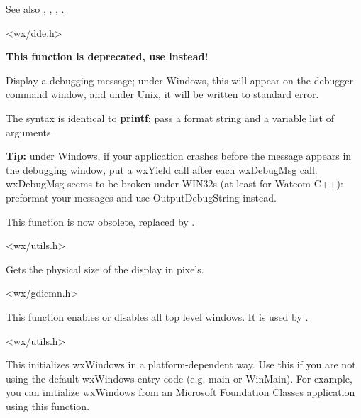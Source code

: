 See also , , ,
.


<wx/dde.h>

\label{wxdebugmsg}


{\bf This function is deprecated, use  instead!}

Display a debugging message; under Windows, this will appear on the
debugger command window, and under Unix, it will be written to standard
error.

The syntax is identical to {\bf printf}: pass a format string and a
variable list of arguments.

{\bf Tip:} under Windows, if your application crashes before the
message appears in the debugging window, put a wxYield call after
each wxDebugMsg call. wxDebugMsg seems to be broken under WIN32s
(at least for Watcom C++): preformat your messages and use OutputDebugString
instead.

This function is now obsolete, replaced by .


<wx/utils.h>



Gets the physical size of the display in pixels.


<wx/gdicmn.h>

\label{wxenabletoplevelwindows}


This function enables or disables all top level windows. It is used by
.


<wx/utils.h>

\label{wxentry}

This initializes wxWindows in a platform-dependent way. Use this if you
are not using the default wxWindows entry code (e.g. main or WinMain). For example,
you can initialize wxWindows from an Microsoft Foundation Classes application using
this function.

